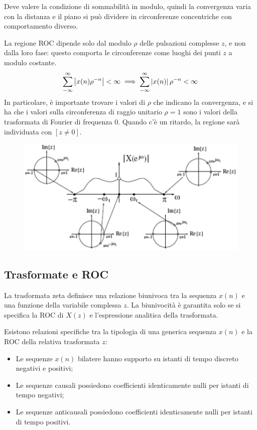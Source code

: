 Deve valere la condizione di sommabilità in modulo, quindi la convergenza varia con la distanza e il piano si può dividere in circonferenze concentriche con comportamento diverso. 

La regione ROC dipende solo dal modulo $\rho$ delle pulsazioni complesse $z$, e non dalla loro fase: questo comporta le circonferenze come luoghi dei punti $z$ a modulo costante.
$$ \sum_{-\infty}^{\infty}\left|x(n)\rho^{-n}\right| < \infty \implies  \sum_{-\infty}^{\infty}\left|x(n)\right|\rho^{-n} < \infty$$
In particolare, è importante trovare i valori di $\rho$ che indicano la convergenza, e si ha che i valori sulla circonferenza di raggio unitario $\rho = 1$ sono i valori della trasformata di Fourier di frequenza 0. Quando c'è un ritardo, la regione sarà individuata con $[z \neq 0]$.

\begin{figure}[h]
	\centering
	\includegraphics[scale=0.3]{Lezioni/Immagini/zdft}
\end{figure}

\subsection{Trasformate e ROC}
La trasformata zeta definisce una relazione biunivoca tra la sequenza $x(n)$ e una funzione della variabile complessa $z$. La biunivocità è garantita solo se si specifica la ROC di $X(z)$ e l'espressione analitica della trasformata.

Esistono relazioni specifiche tra la tipologia di una generica sequenza $x(n)$ e la ROC della relativa trasformata $z$:
\begin{itemize}
	\item Le sequenze $x(n)$ bilatere hanno supporto su istanti di tempo discreto negativi e positivi;
	\item Le sequenze causali possiedono coefficienti identicamente nulli per istanti di tempo negativi;
	\item Le sequenze anticausali possiedono coefficienti identicamente nulli per istanti di tempo positivi.
\end{itemize}

